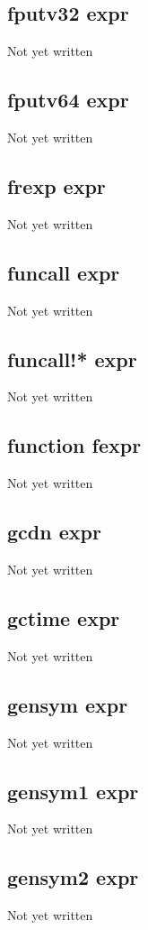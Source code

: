 \documentclass[a4paper,11pt]{article}
\begin{document}
\subsection{\ttfamily fputv32 expr}
Not yet written

\subsection{\ttfamily fputv64 expr}
Not yet written

\subsection{\ttfamily frexp expr}
Not yet written

\subsection{\ttfamily funcall expr}
Not yet written

\subsection{\ttfamily funcall!* expr}
Not yet written

\subsection{\ttfamily function fexpr}
Not yet written

\subsection{\ttfamily gcdn expr}
Not yet written

\subsection{\ttfamily gctime expr}
Not yet written

\subsection{\ttfamily gensym expr}
Not yet written

\subsection{\ttfamily gensym1 expr}
Not yet written

\subsection{\ttfamily gensym2 expr}
Not yet written
\end{document}
